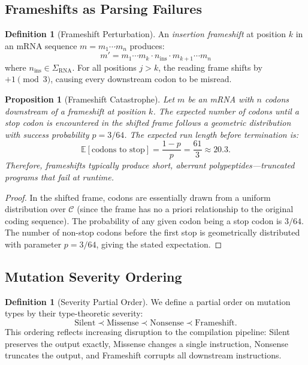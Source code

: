 \documentclass[12pt,a4paper]{article}
\newtheorem{proposition}[theorem]{Proposition}
\theoremstyle{definition}
\newtheorem{definition}[theorem]{Definition}
\begin{document}
\subsection{Frameshifts as Parsing Failures}

\begin{definition}[Frameshift Perturbation]\label{def:frameshift}
An \emph{insertion frameshift} at position $k$ in an mRNA sequence $m = m_1 \cdots m_n$ produces:
\[
  m' = m_1 \cdots m_k \cdot n_{\text{ins}} \cdot m_{k+1} \cdots m_n
\]
where $n_{\text{ins}} \in \Sigma_\mathrm{RNA}$. For all positions $j > k$, the reading frame shifts by $+1 \pmod{3}$, causing every downstream codon to be misread.
\end{definition}

\begin{proposition}[Frameshift Catastrophe]\label{prop:frameshift-catastrophe}
Let $m$ be an mRNA with $n$ codons downstream of a frameshift at position $k$. The expected number of codons until a stop codon is encountered in the shifted frame follows a geometric distribution with success probability $p = 3/64$. The expected run length before termination is:
\[
  \mathbb{E}[\text{codons to stop}] = \frac{1-p}{p} = \frac{61}{3} \approx 20.3.
\]
Therefore, frameshifts typically produce short, aberrant polypeptides---\emph{truncated programs} that fail at runtime.
\end{proposition}

\begin{proof}
In the shifted frame, codons are essentially drawn from a uniform distribution over $\mathcal{C}$ (since the frame has no a priori relationship to the original coding sequence). The probability of any given codon being a stop codon is $3/64$. The number of non-stop codons before the first stop is geometrically distributed with parameter $p = 3/64$, giving the stated expectation.
\end{proof}

\subsection{Mutation Severity Ordering}

\begin{definition}[Severity Partial Order]\label{def:severity}
We define a partial order on mutation types by their type-theoretic severity:
\[
  \text{Silent} \prec \text{Missense} \prec \text{Nonsense} \prec \text{Frameshift}.
\]
This ordering reflects increasing disruption to the compilation pipeline: Silent preserves the output exactly, Missense changes a single instruction, Nonsense truncates the output, and Frameshift corrupts all downstream instructions.
\end{definition}
\end{document}
